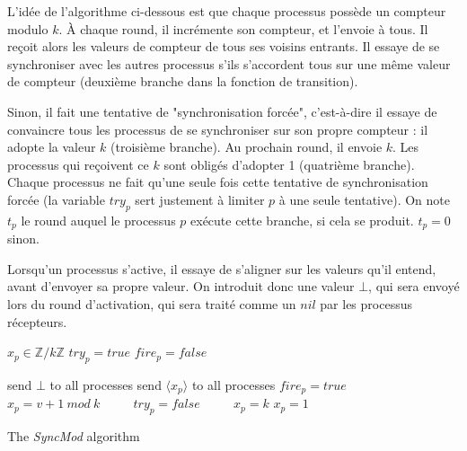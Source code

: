 \documentclass{article}
\begin{document}
L'idée de l'algorithme ci-dessous est que chaque processus possède un compteur modulo $k$. À chaque round, il incrémente son compteur, et l'envoie à tous.
Il reçoit alors les valeurs de compteur de tous ses voisins entrants. Il essaye de se synchroniser avec les autres processus s'ils s'accordent tous sur une même valeur de compteur
(deuxième branche dans la fonction de transition).

Sinon, il fait une tentative de "synchronisation forcée", c'est-à-dire il essaye de convaincre tous les processus de se synchroniser sur son propre compteur :
il adopte la valeur $k$ (troisième branche). Au prochain round, il envoie $k$.  Les processus qui reçoivent ce $k$ sont obligés d'adopter 1 (quatrième branche).
Chaque processus ne fait qu'une seule fois cette tentative de synchronisation forcée (la variable $try_p$ sert justement à limiter $p$ à une seule tentative).
On note $t_p$ le round auquel le processus $p$ exécute cette branche, si cela se produit. $t_p = 0$ sinon.

Lorsqu'un processus s'active, il essaye de s'aligner sur les valeurs qu'il entend, avant d'envoyer sa propre valeur.
On introduit donc une valeur $\bot$, qui sera envoyé lors du round d'activation, qui sera traité comme un $nil$ par les processus récepteurs.

\pagebreak[1]

\begin{algorithm}[htb]
\begin{distribalgo}[1]
\BLANK {}
	\STATE $x_p \in \mathds{Z}/k\mathds{Z}$
	\STATE $try_p = true$
	\STATE $fire_p = false$

\ENDINDENT \BLANK

    \STATE send $\bot$ to all processes
  \ENDINDENT
\ENDINDENT
  \BLANK
{}
    \STATE send $\langle x_p \rangle$ to all processes
  \ENDINDENT
\ENDINDENT
  \BLANK
{}
	\STATE $fire_p = true$ ~~~~
	\ENDIF
	\STATE $x_p = v+1~mod~k$ ~~~~
	\STATE $try_p = false$ ~~~~
	\STATE $x_p = k$
	\ELSE
	\STATE $x_p = 1$ ~~~~
	\ENDIF
  \ENDINDENT
\ENDINDENT 
\caption{The {\em SyncMod} algorithm} \label{algo:R}
\end{distribalgo}

\end{algorithm}
\end{document}
